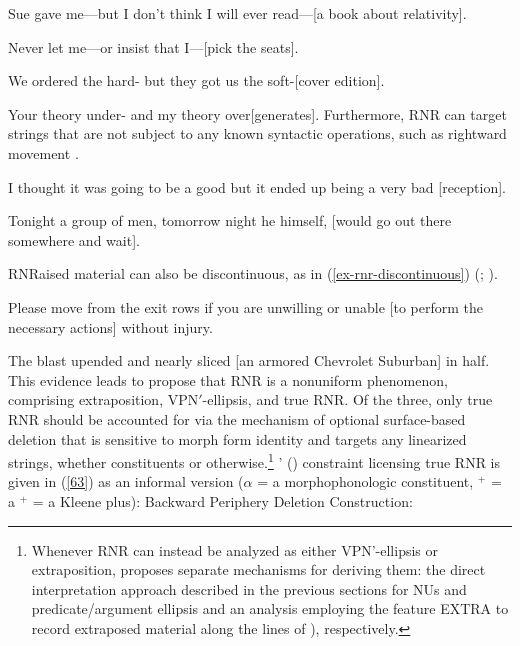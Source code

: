 \documentclass[output=paper
	        ,collection
	        ,collectionchapter
 	        ,biblatex
                ,babelshorthands
                ,newtxmath
                ,draftmode
                ,colorlinks, citecolor=brown
]{langscibook}
\begin{document}
{\eal
\ex Sue gave me---but I don't think I will ever read---[a book about relativity]. \label{54}

\ex Never let me---or insist that I---[pick the seats].\label{55}

\ex We ordered the hard- but they got us the soft-[cover edition].\label{56}

\ex Your theory under- and my theory over[generates].\label{57}\zl
%
Furthermore, RNR can target strings that are not subject to any known syntactic operations, such as rightward movement \citep[865]{Chaves2014}.

\eal
\ex I thought it was going to be a good but it ended up being a very bad [reception].\label{58}

\ex Tonight a group of men, tomorrow night he himself, [would go out there somewhere and wait].\label{59}\zl

RNRaised material can also be discontinuous, as in (\ref{ex-rnr-discontinuous}) (\citealt[868]{Chaves2014}; \citealt[238--240]{Whitman2009}).

\eal
\label{ex-rnr-discontinuous}
\ex Please move from the exit rows if you are unwilling or unable [to perform the necessary actions] without injury.\label{61}

\ex The blast upended and nearly sliced [an armored Chevrolet Suburban] in half.\label{62}\zl
%
This evidence leads \citet{Chaves2014} to propose that RNR is a nonuniform phenomenon, comprising extraposition,  VP\/N$'$-ellipsis, and true RNR.
%
%
%
Of the three, only true RNR should be accounted for via the mechanism of optional surface-based deletion that is sensitive to morph form identity and targets any linearized strings, whether constituents or otherwise.\footnote{Whenever RNR can instead be analyzed as either VP\/N'-ellipsis or extraposition, \citeauthor{Chaves2014} proposes separate mechanisms for deriving them: the direct interpretation approach described in the previous sections for NUs and predicate/argument ellipsis and an analysis employing the feature EXTRA to record extraposed material along the lines of \citeauthor{KimSag2005, Kay2012}), respectively.} \citeauthor{Chaves2014}' (\citeyear[874]{Chaves2014}) constraint licensing true RNR is given in (\ref{63}) as an informal version  ($\alpha$
= a morphophonologic constituent, $^{+}$ = a
 $^{+}$ = a Kleene plus):
%
%
%
%
\ea
\label{63}
 Backward Periphery Deletion Construction:\\

}
\end{document}
